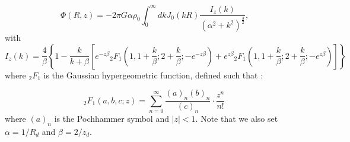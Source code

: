 \begin{equation}
\label{eq:exp-disk-potential}
\Phi(R, z) = - 2\pi G \alpha \rho_0 \int_{0}^{\infty} dk J_0 (kR) \dfrac{I_z (k)}{(\alpha^2 + k^2)^{\frac{3}{2}}}\text{,}
\end{equation}
with
\begin{equation*}
I_z(k) = \dfrac{4}{\beta} \left\{ 1 - \dfrac{k}{k+\beta} \left[ e^{-z\beta} {}_2F_1\left(1, 1 + \frac{k}{\beta}; 2 + \frac{k}{\beta}; -e^{-z\beta} \right) + e^{z\beta} {}_2F_1\left(1, 1 + \frac{k}{\beta}; 2 + \frac{k}{\beta}; -e^{z\beta} \right)\right] \right\}
\end{equation*}
where $_2F_1$ is the Gaussian hypergeometric function, defined such that :

\begin{equation}
    \label{eq:hypergeometric}
    _2F_1(a, b, c; z) = \sum_{n=0}^{\infty} \frac{(a)_n (b)_n}{(c)_n}\cdot \dfrac{z^n}{n!}
\end{equation}
where $(a)_n$ is the Pochhammer symbol and $|z| < 1$. Note that we also set $\alpha=1/R_d$ and $\beta = 2/z_d$.



